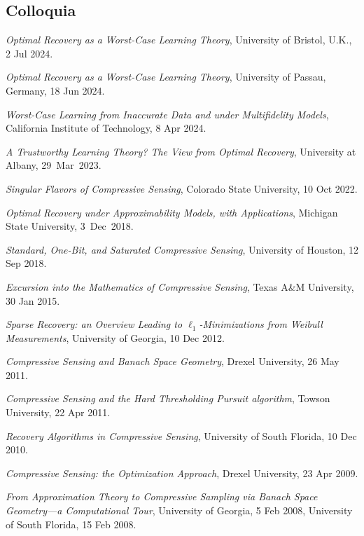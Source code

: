\documentclass[11pt]{article}
\begin{document}
\subsection{Colloquia}
\bitemize
\item {\sl Optimal Recovery as a Worst-Case Learning Theory}, University of Bristol, U.K., 2 Jul 2024.
\item {\sl Optimal Recovery as a Worst-Case Learning Theory}, University of Passau, Germany, 18 Jun 2024.
\item {\sl Worst-Case Learning from Inaccurate Data and under Multifidelity Models},  
California Institute of Technology,  8 Apr 2024.
\item {\sl A Trustworthy Learning Theory? \hspace{-1mm}The View from Optimal Recovery}, University at Albany, 29~Mar~2023.
\item {\sl Singular Flavors of Compressive Sensing}, Colorado State University, 10 Oct 2022.
\item {\sl Optimal Recovery under Approximability Models, with Applications}, Michigan State University, 3~Dec~2018.
\item {\sl Standard, One-Bit, and Saturated Compressive Sensing},
University of Houston, 12 Sep 2018.
\item {\sl Excursion into the Mathematics of Compressive Sensing},
Texas A\&{M} University, 30 Jan 2015.
\item {\sl Sparse Recovery: an Overview Leading to $\ell_1$-Minimizations from Weibull Measurements},
University of Georgia, 10 Dec 2012.
\item {\sl Compressive Sensing and Banach Space Geometry},
Drexel University, 26 May 2011.
\item {\sl Compressive Sensing and the Hard Thresholding Pursuit algorithm},
 Towson University, 22 Apr 2011.
\item {\sl Recovery Algorithms in Compressive Sensing}, University of South Florida, 10 Dec 2010.
\item {\sl Compressive Sensing: the Optimization Approach}, Drexel University, 23 Apr 2009. 
\item {\sl From Approximation Theory to Compressive Sampling via Banach Space Geometry---a Computational Tour},
University of Georgia, 5 Feb 2008,  University of South Florida, 15  Feb 2008.
\eitemize
\end{document}
